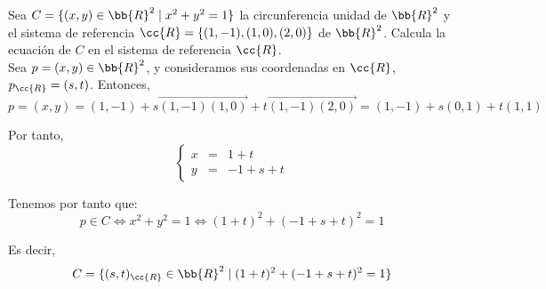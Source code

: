 \begin{ejercicio}
    Sea $C = \{(x, y) \in \bb{R}^2 \mid x^2 + y^2 = 1\}$ la circunferencia unidad de $\bb{R}^2$ y el sistema de referencia $\cc{R} = \{(1, -1),(1, 0),(2, 0)\}$ de $\bb{R}^2$. Calcula la ecuación de $C$ en el sistema de referencia $\cc{R}$.\\

    Sea $p=(x,y)\in \bb{R}^2$, y consideramos sus coordenadas en $\cc{R}$, $p_{\cc{R}}=(s,t)$. Entonces,
    \begin{equation*}
        p=(x,y) = (1,-1) + s\vec{(1,-1)(1,0)} +t\vec{(1,-1)(2,0)}
        = (1,-1) + s(0,1) +t(1,1)
    \end{equation*}
    
    Por tanto,
    \begin{equation*}
        \left\{
        \begin{array}{lll}
            x & = & 1+t \\
            y & = & -1+s+t
        \end{array}
        \right.
    \end{equation*}

    Tenemos por tanto que:
    \begin{equation*}
        p\in C\Longleftrightarrow x^2+y^2=1 \Longleftrightarrow
        (1+t)^2 + (-1+s+t)^2=1
    \end{equation*}

    Es decir,
    \begin{equation*}
        C=\{(s,t)_{\cc{R}}\in \bb{R}^2\mid (1+t)^2 + (-1+s+t)^2=1\}
    \end{equation*}
\end{ejercicio}


